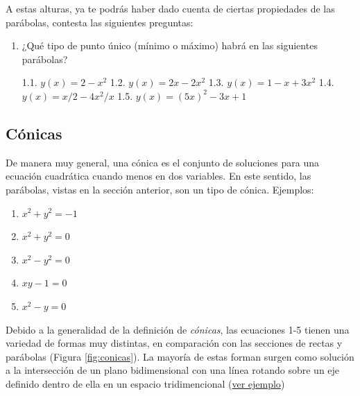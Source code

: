 \documentclass[
]{book}
\providecommand{\tightlist}{%
  \setlength{\itemsep}{0pt}\setlength{\parskip}{0pt}}
\begin{document}
A estas alturas, ya te podrás haber dado cuenta de ciertas propiedades de las parábolas, contesta las siguientes preguntas:

\begin{enumerate}
\def\labelenumi{\arabic{enumi}.}
\item
  ¿Qué tipo de punto único (mínimo o máximo) habrá en las siguientes parábolas?

  1.1. \(y(x) = 2 - x^2\)
  1.2. \(y(x) = 2x - 2x^2\)
  1.3. \(y(x) = 1 - x + 3x^2\)
  1.4. \(y(x) = x/2 - 4x^2/x\)
  1.5. \(y(x) = (5x)^2 - 3x + 1\)
\end{enumerate}

\hypertarget{cuxf3nicas}{%
\subsection{Cónicas}\label{cuxf3nicas}}

De manera muy general, una cónica es el conjunto de soluciones para una ecuación cuadrática cuando menos en dos variables. En este sentido, las parábolas, vistas en la sección anterior, son un tipo de cónica. Ejemplos:

\begin{enumerate}
\def\labelenumi{\arabic{enumi}.}
\tightlist
\item
  \(x^2 + y^2 = -1\)
\item
  \(x^2 + y^2 = 0\)
\item
  \(x^2 - y^2 = 0\)
\item
  \(xy - 1 = 0\)
\item
  \(x^2 - y = 0\)
\end{enumerate}

Debido a la generalidad de la definición de \emph{cónicas}, las ecuaciones 1-5 tienen una variedad de formas muy distintas, en comparación con las secciones de rectas y parábolas (Figura \ref{fig:conicas}). La mayoría de estas forman surgen como solución a la intersección de un plano bidimensional con una línea rotando sobre un eje definido dentro de ella en un espacio tridimencional (\href{https://www.mathplanet.com/Oldsite/media/28029/conic.png}{ver ejemplo})
\end{document}

